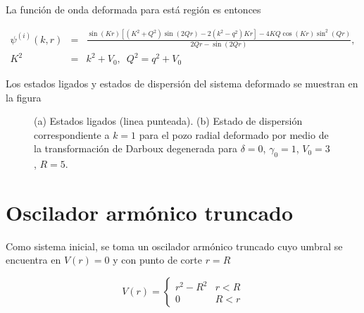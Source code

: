  La función de onda  deformada para está región es entonces

\begin{eqnarray*}
	\psi^{(i)}(k,r) &=& \frac{\sin(K r)[(K^2 + Q^2)\sin(2 Q r)-2 (k^2 - q^2)K r] - 4 K Q \cos(K r)\sin^2(Q r)}{2Q r - \sin(2 Q r)},
	\\
	 K^2 &=& k^2 + V_0,\,\,\, Q^2 = q^2 + V_0
\end{eqnarray*}

Los estados ligados  y estados de dispersión del sistema deformado se muestran en la figura

\begin{figure}
	\centering
	\hfill%
	\caption{\label{PRSD-Figure} (a) Estados ligados (linea punteada). (b) Estado de dispersión correspondiente a $k=1$ para el pozo radial deformado por medio de la transformación de Darboux degenerada para $\delta = 0$, $\gamma_0 = 1$, $V_0=3$, $R = 5$.}
\end{figure}



\section{Oscilador armónico truncado}

Como sistema inicial, se toma un oscilador armónico truncado cuyo umbral se encuentra en $V(r)=0$ y con punto de corte $r=R$

\begin{equation}
V(r)= \begin{cases}
r^2 - R^2 & r < R
\\ 0 & R < r \label{POAT}
\end{cases}
\end{equation}

